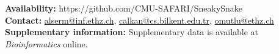 \documentclass{bioinfo}
\newcommand{\CA}[1]{\textbf{\color{magenta}{[#1]}}}
\begin{document}
{%
\textbf{Availability:} https://github.com/CMU-SAFARI/SneakySnake\\
\textbf{Contact:} \href{alserm@inf.ethz.ch}{alserm@inf.ethz.ch}, \href{calkan@cs.bilkent.edu.tr}{calkan@cs.bilkent.edu.tr}, \href{omutlu@ethz.ch}{omutlu@ethz.ch}\\
\textbf{Supplementary information:} Supplementary data is available at \emph{Bioinformatics} online.
\\}
\maketitle




\end{document}
